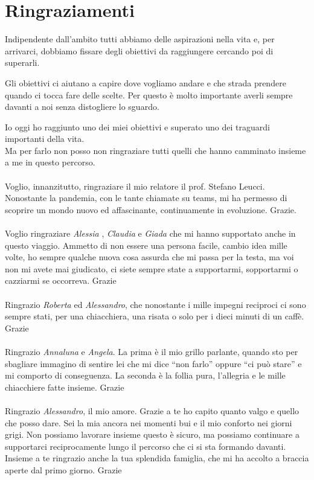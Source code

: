 \chapter*{Ringraziamenti}

Indipendente dall'ambito tutti abbiamo delle aspirazioni nella vita e, per arrivarci, dobbiamo fissare degli obiettivi da raggiungere cercando poi di superarli.

Gli obiettivi ci aiutano a capire dove vogliamo andare e che strada prendere quando ci tocca fare delle scelte. Per questo \`e molto importante averli sempre davanti a noi senza distogliere lo sguardo.

Io oggi ho raggiunto uno dei miei obiettivi e superato uno dei traguardi importanti della vita.\\
Ma per farlo non posso non ringraziare tutti quelli che hanno camminato insieme a me in questo percorso.
\\
\\
Voglio, innanzitutto, ringraziare il mio relatore il prof. Stefano Leucci. Nonostante la pandemia, con le tante chiamate su teams, mi ha permesso di scoprire un mondo nuovo ed affascinante, continuamente in evoluzione. Grazie.
\\
\\
Voglio ringraziare \textit{Alessia} , \textit{Claudia} e \textit{Giada} che mi hanno supportato anche in questo viaggio. 
Ammetto di non essere una persona facile, cambio idea mille volte, ho sempre qualche nuova cosa assurda che mi passa per la testa, ma voi non mi avete mai giudicato, ci siete sempre state a supportarmi, sopportarmi o cazziarmi se occorreva. Grazie
\\
\\
Ringrazio \textit{Roberta} ed \textit{Alessandro}, che nonostante i mille impegni reciproci ci sono sempre stati, per una chiacchiera, una risata o solo per i dieci minuti di un caff\`e. Grazie
\\
\\
Ringrazio \textit{Annaluna} e \textit{Angela}. La prima \`e il mio grillo parlante, quando sto per sbagliare immagino di sentire lei che mi dice ``non farlo'' oppure ``ci pu\`o stare'' e mi comporto di conseguenza. La seconda \`e la follia pura, l'allegria e le mille chiacchiere fatte insieme. Grazie
\\
\\
Ringrazio \textit{ Alessandro}, il mio amore. Grazie a te ho capito quanto valgo e quello che posso dare.
Sei la mia ancora nei momenti bui e il mio conforto nei giorni grigi. Non possiamo lavorare insieme questo \`e sicuro, ma possiamo continuare a supportarci reciprocamente lungo il percorso che ci si sta formando davanti. Insieme a te ringrazio anche la tua splendida famiglia, che mi ha accolto a braccia aperte dal primo giorno. Grazie
